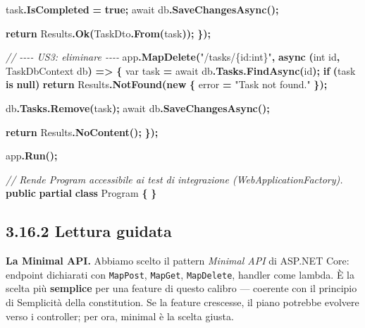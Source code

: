 \documentclass[
  italian,
  10pt,
]{book}
\newenvironment{Shaded}{\begin{snugshade}}{\end{snugshade}}
\newcommand{\CommentTok}[1]{\textcolor[rgb]{0.56,0.35,0.01}{\textit{#1}}}
\newcommand{\DataTypeTok}[1]{\textcolor[rgb]{0.13,0.29,0.53}{#1}}
\newcommand{\FunctionTok}[1]{\textcolor[rgb]{0.13,0.29,0.53}{\textbf{#1}}}
\newcommand{\KeywordTok}[1]{\textcolor[rgb]{0.13,0.29,0.53}{\textbf{#1}}}
\newcommand{\NormalTok}[1]{#1}
\newcommand{\OperatorTok}[1]{\textcolor[rgb]{0.81,0.36,0.00}{\textbf{#1}}}
\newcommand{\StringTok}[1]{\textcolor[rgb]{0.31,0.60,0.02}{#1}}
\begin{document}
\begin{Shaded}
\begin{Highlighting}[]
\NormalTok{    task}\OperatorTok{.}\FunctionTok{IsCompleted} \OperatorTok{=} \KeywordTok{true}\OperatorTok{;}
\NormalTok{    await db}\OperatorTok{.}\FunctionTok{SaveChangesAsync}\OperatorTok{();}

    \KeywordTok{return}\NormalTok{ Results}\OperatorTok{.}\FunctionTok{Ok}\OperatorTok{(}\NormalTok{TaskDto}\OperatorTok{.}\FunctionTok{From}\OperatorTok{(}\NormalTok{task}\OperatorTok{));}
\OperatorTok{\});}

\CommentTok{// {-}{-}{-}{-} US3: eliminare {-}{-}{-}{-}}
\NormalTok{app}\OperatorTok{.}\FunctionTok{MapDelete}\OperatorTok{(}\StringTok{"/tasks/\{id:int\}"}\OperatorTok{,} \FunctionTok{async} \OperatorTok{(}\DataTypeTok{int}\NormalTok{ id}\OperatorTok{,}\NormalTok{ TaskDbContext db}\OperatorTok{)} \OperatorTok{=\textgreater{}}
\OperatorTok{\{}
    \DataTypeTok{var}\NormalTok{ task }\OperatorTok{=}\NormalTok{ await db}\OperatorTok{.}\FunctionTok{Tasks}\OperatorTok{.}\FunctionTok{FindAsync}\OperatorTok{(}\NormalTok{id}\OperatorTok{);}
    \KeywordTok{if} \OperatorTok{(}\NormalTok{task }\KeywordTok{is} \KeywordTok{null}\OperatorTok{)}
        \KeywordTok{return}\NormalTok{ Results}\OperatorTok{.}\FunctionTok{NotFound}\OperatorTok{(}\KeywordTok{new} \OperatorTok{\{}\NormalTok{ error }\OperatorTok{=} \StringTok{"Task not found."} \OperatorTok{\});}

\NormalTok{    db}\OperatorTok{.}\FunctionTok{Tasks}\OperatorTok{.}\FunctionTok{Remove}\OperatorTok{(}\NormalTok{task}\OperatorTok{);}
\NormalTok{    await db}\OperatorTok{.}\FunctionTok{SaveChangesAsync}\OperatorTok{();}

    \KeywordTok{return}\NormalTok{ Results}\OperatorTok{.}\FunctionTok{NoContent}\OperatorTok{();}
\OperatorTok{\});}

\NormalTok{app}\OperatorTok{.}\FunctionTok{Run}\OperatorTok{();}

\CommentTok{// Rende Program accessibile ai test di integrazione (WebApplicationFactory).}
\KeywordTok{public} \KeywordTok{partial} \KeywordTok{class}\NormalTok{ Program }\OperatorTok{\{} \OperatorTok{\}}
\end{Highlighting}
\end{Shaded}

\subsection{3.16.2 Lettura guidata}\label{lettura-guidata}

\textbf{La Minimal API.} Abbiamo scelto il pattern \emph{Minimal API} di
ASP.NET Core: endpoint dichiarati con \texttt{MapPost}, \texttt{MapGet},
\texttt{MapDelete}, handler come lambda. È la scelta più
\textbf{semplice} per una feature di questo calibro --- coerente con il
principio di Semplicità della constitution. Se la feature crescesse, il
piano potrebbe evolvere verso i controller; per ora, minimal è la scelta
giusta.
\end{document}
